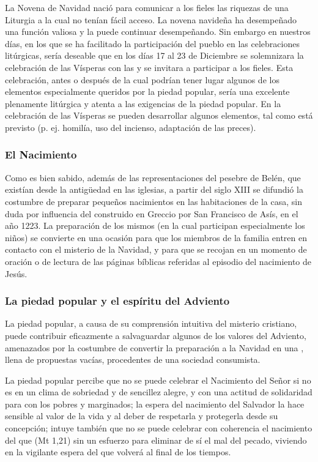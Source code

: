 \begin{introstyle}
	La Novena de Navidad nació para comunicar a los fieles las riquezas de una Liturgia a la cual no tenían fácil acceso. La novena navideña ha desempeñado una función valiosa y la puede continuar desempeñando. Sin	embargo en nuestros días, en los que se ha facilitado la participación del pueblo en las celebraciones litúrgicas, sería deseable que en los	días 17 al 23 de Diciembre se solemnizara la celebración de las Vísperas con las  y se invitara a participar a los fieles. Esta celebración, antes o después de la cual podrían tener lugar algunos	de los elementos especialmente queridos por la piedad popular, sería una excelente  plenamente litúrgica y atenta a las	exigencias de la piedad popular. En la celebración de las Vísperas se pueden desarrollar algunos elementos, tal como está previsto (p. ej. homilía, uso del incienso, adaptación de las preces).
	
	
	\subsubsection{El Nacimiento}
	
	Como es bien sabido, además de las representaciones del pesebre de	Belén, que existían desde la antigüedad en las iglesias, a partir del siglo XIII se difundió la costumbre de preparar pequeños nacimientos en las habitaciones de la casa, sin duda por influencia del 	construido en Greccio por San Francisco de Asís, en el año 1223. La
	preparación de los mismos (en la cual participan especialmente los niños) se convierte en una ocasión para que los miembros de la familia	entren en contacto con el misterio de la Navidad, y para que se recojan en un momento de oración o de lectura de las páginas bíblicas referidas al episodio del nacimiento de Jesús.
	
	
	\subsubsection{La piedad popular y el espíritu del Adviento}
	
	La piedad popular, a causa de su comprensión intuitiva del misterio cristiano, puede contribuir eficazmente a salvaguardar algunos de los valores del Adviento, amenazados por la costumbre de convertir la preparación a la Navidad en una , llena de propuestas vacías, procedentes de una sociedad consumista.
	
	La piedad popular percibe que no se puede celebrar el Nacimiento del Señor si no es en un clima de sobriedad y de sencillez alegre, y con una	actitud de solidaridad para con los pobres y marginados; la espera del nacimiento del Salvador la hace sensible al valor de la vida y al deber	de respetarla y protegerla desde su concepción; intuye también que no se
	puede celebrar con coherencia el nacimiento del que  (Mt 1,21) sin un esfuerzo para eliminar de sí el mal del pecado, viviendo en la vigilante espera del que volverá al final de los tiempos.
	

\end{introstyle}
